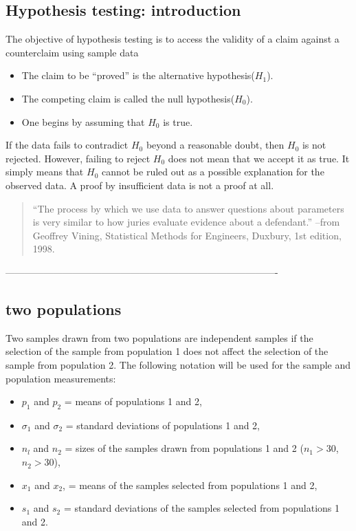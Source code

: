 \subsection{Hypothesis testing: introduction}
The objective of hypothesis testing is to access the validity of a claim against a counterclaim using sample data
\begin{itemize}\item The claim to be “proved” is the alternative hypothesis($H_1$).\item The competing claim is called the null hypothesis($H_0$).\item One begins by assuming that $H_0$ is true. \end{itemize}

If the data fails to contradict $H_0$ beyond a reasonable doubt, then $H_0$ is not rejected. However, failing to reject $H_0$ does not mean that we accept it as true. It simply means that $H_0$ cannot be ruled out as a possible explanation for the observed data. A proof by insufficient data is not a proof at all.

\begin{quote}
“The process by which we use data to answer questions about parameters
is very similar to how juries evaluate evidence about a defendant.” –from
Geoffrey Vining, Statistical Methods for Engineers, Duxbury, 1st edition,
1998.
\end{quote}


-------------------------------------------------------------------------------------

\subsection{two populations}

Two samples drawn from two populations are independent samples if
the selection of the sample from population 1 does not affect the
selection of the sample from population 2. The following notation
will be used for the sample and population measurements:

\begin{itemize}
\item $p_1$ and $p_2$ = means of populations 1 and 2,

\item $\sigma_1$ and $\sigma_2$ = standard deviations of
populations 1 and 2,

\item $n_l$ and $n_2$ = sizes of the samples drawn from
populations 1 and 2 ($n_1 >30 $, $n_2 >30 $),

\item $x_1$ and $x_2$, = means of the samples selected from
populations 1 and 2,

\item $s_{1}$ and $s_{2}$ = standard deviations of the samples
selected from populations 1 and 2.

\end{itemize}
\newpage


